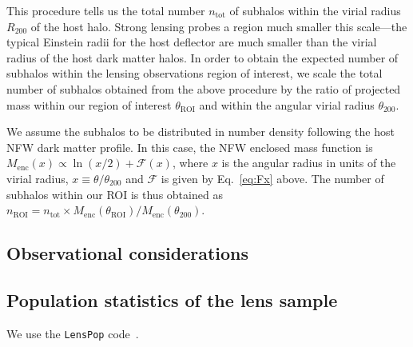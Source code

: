 \documentclass[twocolumn]{aastex62}
\newcommand{\Rtwo}{R_{200}}
\begin{document}
This procedure tells us the total number $n_\mathrm{tot}$ of subhalos within the virial radius $\Rtwo$ of the host halo. Strong lensing probes a region much smaller this scale---the typical Einstein radii for the host deflector are much smaller than the virial radius of the host dark matter halos. In order to obtain the expected number of subhalos within the lensing observations region of interest, we scale the total number of subhalos obtained from the above procedure by the ratio of projected mass within our region of interest $\theta_\textrm{ROI}$ and within the angular virial radius $\theta_{200}$.

We assume the subhalos to be distributed in number density following the host NFW dark matter profile. In this case, the NFW enclosed mass function is $M_\mathrm{enc}(x) \propto \ln(x/2) + \mathcal{F}(x)$, where $x$ is the angular radius in units of the virial radius, $x\equiv \theta/\theta_{200}$ and $\mathcal{F}$ is given by Eq.~\ref{eq:Fx} above. The number of subhalos within our ROI is thus obtained as $n_\mathrm{ROI} = n_\mathrm{tot}\times M_\mathrm{enc}(\theta_\textrm{ROI})/M_\mathrm{enc}(\theta_{200})$.

\subsection{Observational considerations}
\label{sec:observations}


\subsection{Population statistics of the lens sample}
\label{sec:populations}

We use the \texttt{LensPop} code~\citep{2015ApJ...811...20C}.


\acknowledgements


\software{
}



\end{document}
